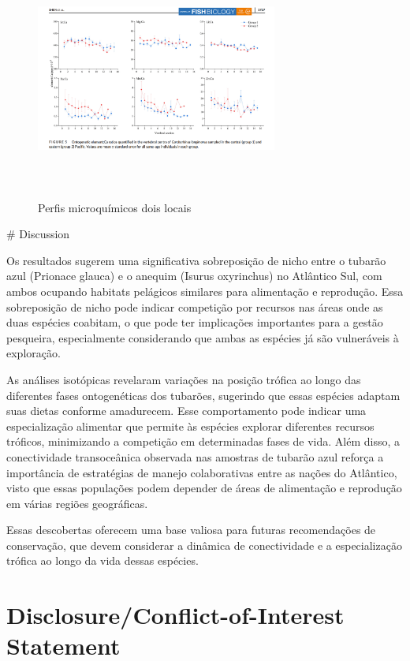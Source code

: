 \documentclass[utf8]{FrontiersinHarvard}
\begin{document}
\begin{figure}
\centering
\includegraphics[width=3.125in,height=3.125in]{group23.png}
\caption{Perfis microquímicos dois locais}
\end{figure}

\# Discussion

Os resultados sugerem uma significativa sobreposição de nicho entre o
tubarão azul (Prionace glauca) e o anequim (Isurus oxyrinchus) no
Atlântico Sul, com ambos ocupando habitats pelágicos similares para
alimentação e reprodução. Essa sobreposição de nicho pode indicar
competição por recursos nas áreas onde as duas espécies coabitam, o que
pode ter implicações importantes para a gestão pesqueira, especialmente
considerando que ambas as espécies já são vulneráveis à exploração.

As análises isotópicas revelaram variações na posição trófica ao longo
das diferentes fases ontogenéticas dos tubarões, sugerindo que essas
espécies adaptam suas dietas conforme amadurecem. Esse comportamento
pode indicar uma especialização alimentar que permite às espécies
explorar diferentes recursos tróficos, minimizando a competição em
determinadas fases de vida. Além disso, a conectividade transoceânica
observada nas amostras de tubarão azul reforça a importância de
estratégias de manejo colaborativas entre as nações do Atlântico, visto
que essas populações podem depender de áreas de alimentação e reprodução
em várias regiões geográficas.

Essas descobertas oferecem uma base valiosa para futuras recomendações
de conservação, que devem considerar a dinâmica de conectividade e a
especialização trófica ao longo da vida dessas espécies.

\section*{Disclosure/Conflict-of-Interest
Statement}\label{disclosureconflict-of-interest-statement}
\end{document}
